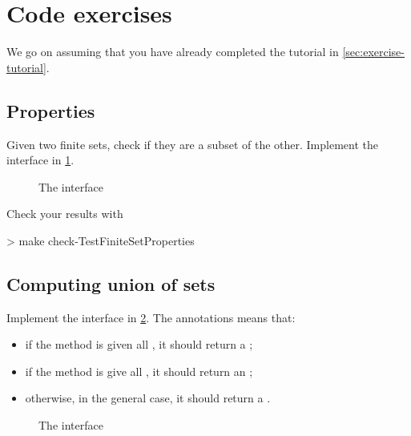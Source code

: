

\section{Code exercises}

We go on assuming that you have already completed the tutorial in \cref{sec:exercise-tutorial}.

\subsection{Properties}

\begin{gradedexercise}
  Given two finite sets, check if they are a subset of the other.
  Implement the interface in \cref{fig:FiniteSetProperties}.

\end{gradedexercise}

\begin{figure}
\caption{The  interface}
\label{fig:FiniteSetProperties}
\end{figure}
Check your results with
\begin{console}
  > make check-TestFiniteSetProperties
\end{console}

\subsection{Computing union of sets}


\begin{gradedexercise}
  Implement the interface in \cref{fig:MakeSetUnion}.
  The  annotations means that:
   \begin{itemize}
   \item if the method is given all \FiniteSet, it should return a \FiniteSet;
    \item if the method is give all \EnumerableSet, it should return an \EnumerableSet;
    \item otherwise, in the general case, it should return a \Setoid.
    \end{itemize}
\end{gradedexercise}


\begin{figure}
\caption{The  interface}
\label{fig:MakeSetUnion}
\end{figure}

